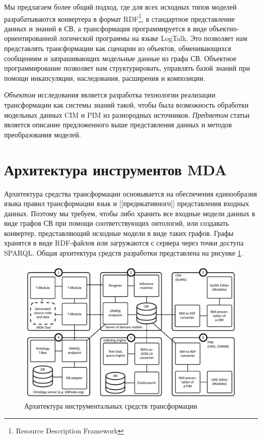 \documentclass[conference]{IEEEtran} \IEEEoverridecommandlockouts
\begin{document}
Мы предлагаем более общий подход, где для всех исходных типов моделей разрабатываются конвертера в формат RDF\footnote{Resource Description Framework}, в стандартное представление данных и знаний в СВ, а трансформация программируется в виде объектно-ориентированной логической программы на языке LogTalk. Это позволяет нам представлять трансформации как сценарии из объектов, обменивающихся сообщениям и запрашивающих модельные данные из графа СВ. Объектное программирование позволяет нам структурировать, управлять базой знаний при помощи инкапсуляции, наследования, расширения и композиции. 

\emph{Объектом} исследования является разработка технологии реализации трансформации как системы знаний такой, чтобы была возможность обработки модельных данных CIM и PIM из разнородных источников. \emph{Предметом} статьи является описание предложенного выше представления данных и методов преобразования моделей. 

\section{Архитектура инструментов MDA} 

Архитектура средства трансформации основывается на обеспечения единообразия языка правил трансформации язык и [[предикативного]] представления входных данных. Поэтому мы требуем, чтобы либо хранить все входные модели данных в виде графов СВ при помощи соответствующих онтологий, или создавать конвертер, представляющий исходные модели в виде таких графов. Графы хранятся в виде RDF-файлов или загружаются с сервера через точки доступа SPARQL. Общая архитектура средств разработки представлена на рисунке \ref{fig:archi}. 

\begin{figure}[htb] \centering

\includegraphics[width=1\linewidth]{pics/architecture-mda-lod-ext.pdf} \caption{Архитектура инструментальных средств трансформации} \label{fig:archi} \end{figure} 
\end{document}
